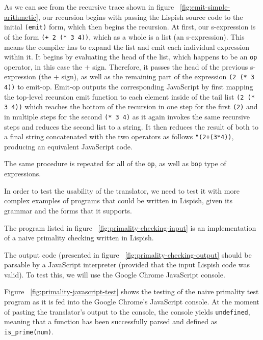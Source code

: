As we can see from the recursive trace shown in figure ~\ref{fig:emit-simple-arithmetic}, our recursion begins with passing the Lispish source code to the initial \texttt{(emit)} form, which then begins the recursion.
At first, our s-expression is of the form \texttt{(+ 2 (* 3 4))}, which as a whole is a list (an s-expression). This means the compiler has to expand the list and emit each individual expression within it. It begins by evaluating the head of the list, which happens to be an \texttt{op} operator, in this case the \texttt{$+$} sign. 
Therefore, it passes the head of the previous s-expression (the \texttt{$+$} sign), as well as the remaining part of the expression \texttt{(2 (* 3 4))}  to emit-op. 
Emit-op outputs the corresponding JavaScript by first mapping the top-level recursion emit function to each element inside of the tail list \texttt{(2 (* 3 4))} which reaches the bottom of the recursion in one step for the first \texttt{(2)} and in multiple steps for the second \texttt{(* 3 4)} as it again invokes the same recursive steps and reduces the second list to a string. It then reduces the result of both to a final string concatenated with the two operators as follows \texttt{"(2+(3*4))}, producing an equivalent JavaScript code. 

The same procedure is repeated for all of the \texttt{op}, as well as \texttt{bop} type of expressions.

In order to test the usability of the translator, we need to test it with more complex examples of programs that could be written in Lispish, given its grammar and the forms that it supports.



The program listed in figure ~\ref{fig:primality-checking-input} is an implementation of a naive primality checking written in Lispish. 



The output code (presented in figure ~\ref{fig:primality-checking-output} should be parsable by a JavaScript interpreter (provided that the input Lispish code was valid). To test this, we will use the Google Chrome JavaScript console.



Figure ~\ref{fig:primality-javascript-test} shows the testing of the naive primality test program as it is fed into the Google Chrome's JavaScript console. 
At the moment of pasting the translator's output to the console, the console yields \texttt{undefined}, meaning that a function has been successfully parsed and defined as \texttt{is\_prime(num)}. 

